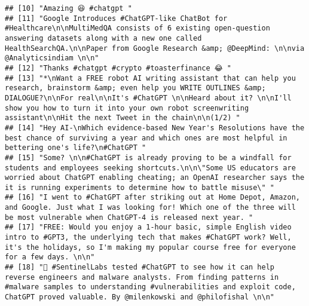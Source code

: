 \documentclass[
]{article}
\begin{document}
\begin{verbatim}
## [10] "Amazing 😆 #chatgpt "                                                                                                                                                                                                                                                                                          
## [11] "Google Introduces #ChatGPT-like ChatBot for #Healthcare\n\nMultiMedQA consists of 6 existing open-question answering datasets along with a new one called HealthSearchQA.\n\nPaper from Google Research &amp; @DeepMind: \n\nvia @Analyticsindiam \n\n"                                                        
## [12] "Thanks #chatgpt #crypto #toasterfinance 😂 "                                                                                                                                                                                                                                                                   
## [13] "*\nWant a FREE robot AI writing assistant that can help you research, brainstorm &amp; even help you WRITE OUTLINES &amp; DIALOGUE?\n\nFor real\n\nIt's #ChatGPT \n\nHeard about it? \n\nI'll show you how to turn it into your own robot screenwriting assistant\n\nHit the next Tweet in the chain\n\n(1/2) "
## [14] "Hey AI-\nWhich evidence-based New Year's Resolutions have the best chance of surviving a year and which ones are most helpful in bettering one's life?\n#ChatGPT "                                                                                                                                             
## [15] "Some? \n\n#ChatGPT is already proving to be a windfall for students and employees seeking shortcuts.\n\n\"Some US educators are worried about ChatGPT enabling cheating; an OpenAI researcher says the it is running experiments to determine how to battle misuse\" "                                         
## [16] "I went to #ChatGPT after striking out at Home Depot, Amazon, and Google. Just what I was looking for! Which one of the three will be most vulnerable when ChatGPT-4 is released next year. "                                                                                                                   
## [17] "FREE: Would you enjoy a 1-hour basic, simple English video intro to #GPT3, the underlying tech that makes #ChatGPT work? Well, it's the holidays, so I'm making my popular course free for everyone for a few days. \n\n"                                                                                      
## [18] "🤖 #SentinelLabs tested #ChatGPT to see how it can help reverse engineers and malware analysts. From finding patterns in #malware samples to understanding #vulnerabilities and exploit code, ChatGPT proved valuable. By @milenkowski and @philofishal \n\n"                                                  

\end{verbatim}
\end{document}
